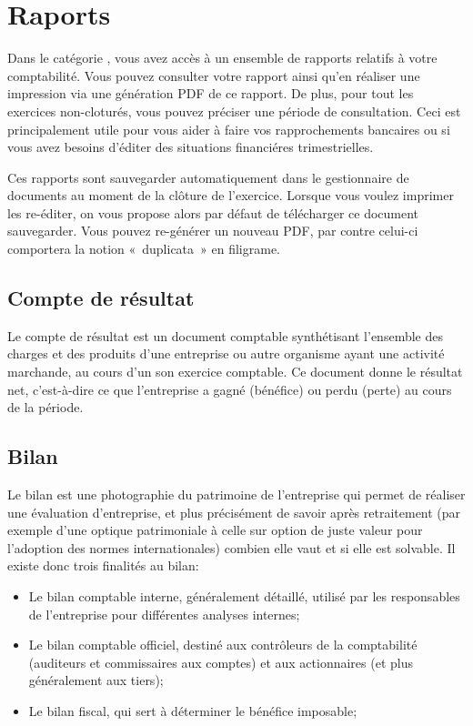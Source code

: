 \documentclass[a4paper,10pt,oneside,french]{sphinxmanual}
\begin{document}
\section{Raports}
\label{\detokenize{accounting/reporting:raports}}\label{\detokenize{accounting/reporting::doc}}
Dans le catégorie , vous avez accès à un ensemble de rapports relatifs à votre comptabilité.
Vous pouvez consulter votre rapport ainsi qu’en réaliser une impression via une génération PDF de ce rapport.
De plus, pour tout les exercices non-cloturés, vous pouvez préciser une période de consultation.
Ceci est principalement utile pour vous aider à faire vos rapprochements bancaires ou si vous avez besoins d’éditer des situations financiéres trimestrielles.

Ces rapports sont sauvegarder automatiquement dans le gestionnaire de documents au moment de la clôture de l’exercice.
Lorsque vous voulez imprimer les re-éditer, on vous propose alors par défaut de télécharger ce document sauvegarder.
Vous pouvez re-générer un nouveau PDF, par contre celui-ci comportera la notion « duplicata » en filigrame.


\subsection{Compte de résultat}
\label{\detokenize{accounting/reporting:compte-de-resultat}}
Le compte de résultat est un document comptable synthétisant l’ensemble des charges et des produits d’une entreprise ou autre organisme ayant une activité marchande, au cours d’un son exercice comptable.
Ce document donne le résultat net, c’est-à-dire ce que l’entreprise a gagné (bénéfice) ou perdu (perte) au cours de la période.


\subsection{Bilan}
\label{\detokenize{accounting/reporting:bilan}}
Le bilan est une photographie du patrimoine de l’entreprise qui permet de réaliser une évaluation d’entreprise, et plus précisément de savoir après retraitement (par exemple d’une optique patrimoniale à celle sur option de juste valeur pour l’adoption des normes internationales) combien elle vaut et si elle est solvable.
Il existe donc trois finalités au bilan:
\begin{itemize}
\item {} 
Le bilan comptable interne, généralement détaillé, utilisé par les responsables de l’entreprise pour différentes analyses internes;

\item {} 
Le bilan comptable officiel, destiné aux contrôleurs de la comptabilité (auditeurs et commissaires aux comptes) et aux actionnaires (et plus généralement aux tiers);

\item {} 
Le bilan fiscal, qui sert à déterminer le bénéfice imposable;

\end{itemize}
\end{document}
